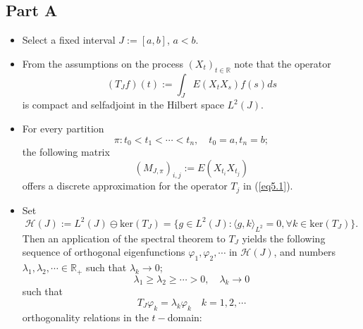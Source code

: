 \documentclass{amsart}
\theoremstyle{definition}
\theoremstyle{remark}
\numberwithin{equation}{section}
\begin{document}
\subsection{Part A}
\label{partA}
\begin{itemize}
  \item Select a fixed interval $J:=[a,b]$, $a<b$.
  \item From the assumptions on the process $(X_{t})_{t \in \mathbb{R}}$ 
        note that the operator
        \begin{equation}
        
        \label{eq5.1}
          (T_{J}f)(t):= \int_{J}E(X_{t}X_{s})f(s)ds 
        \end{equation}
        is compact and selfadjoint in the Hilbert space $L^{2}(J)$.
  \item For every partition 
        \[
          \pi:t_{0} < t_{1} < \cdots < t_{n}, \quad t_{0}=a, t_{n}=b;
        \]
        the following matrix
        \begin{equation}
        
        \label{eq5.2}
          (M_{J, \pi})_{i,j}:=E(X_{t_{i}} X_{t_{j}})
        \end{equation}
        offers a discrete approximation for the operator $T_{j}$ in 
        (\ref{eq5.1}).
  \item Set
        \begin{equation}
        
        \label{eq5.3}
          \mathcal{H}(J):=L^{2}(J)\ominus \text{ker}(T_{J})=
          \{g \in L^{2}(J): \langle g,k\rangle_{L^{2}}=0, \forall k \in 
          \text{ker}(T_{J})\}.
        \end{equation}
        Then an application of the spectral theorem to $T_{J}$ yields the 
        following sequence of orthogonal eigenfunctions 
        $\varphi_{1}, \varphi_{2}, \cdots $ in $\mathcal{H}(J)$, and numbers 
        $\lambda_{1}, \lambda_{2}, \cdots \in \mathbb{R}_{+}$ such that 
        $\lambda_{k} \to 0$; 
        \[
          \lambda_{1} \geq \lambda_{2} \geq \cdots > 0, \quad 
          \lambda_{k} \to 0
        \]
        such that
        \begin{equation}
        
        \label{eq5.4}
          T_{J}\varphi_{k}=\lambda_{k}\varphi_{k} \quad k=1,2, \cdots
        \end{equation}
        orthogonality relations in the $t-$domain:
        \begin{equation}
        

\end{equation}
\end{itemize}
\end{document}
